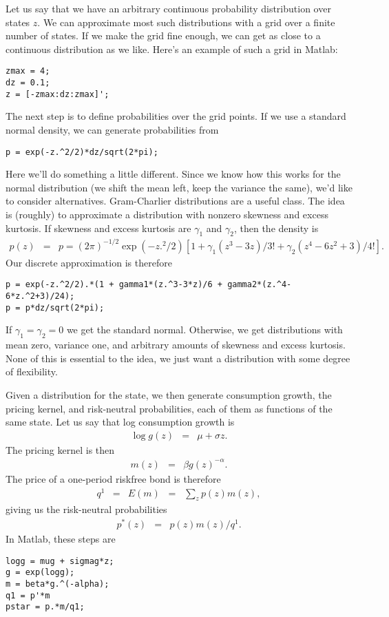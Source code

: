 \documentclass[11pt]{article}
\begin{document}
Let us say that we have an arbitrary continuous probability distribution over states $z$.
We can approximate most such distributions with a grid over a finite number
of states.
If we make the grid fine enough, we can get as close to a continuous distribution
as we like.
Here's an example of such a grid in Matlab:
\begin{verbatim}
zmax = 4;
dz = 0.1;
z = [-zmax:dz:zmax]';
\end{verbatim}
The next step is to define probabilities over the grid points.
If we use a standard normal density, we can generate probabilities from
\begin{verbatim}
p = exp(-z.^2/2)*dz/sqrt(2*pi);
\end{verbatim}
Here we'll do something a little different.
Since we know how this works for the normal distribution
(we shift the mean left, keep the variance the same),
we'd like to consider alternatives.
Gram-Charlier distributions are a useful class.
The idea is (roughly) to approximate a distribution
with nonzero skewness and excess kurtosis.
If skewness and excess kurtosis are $\gamma_1$ and $\gamma_2$,
then the density is
\begin{eqnarray*}
    p(z) &=& p = (2 \pi)^{-1/2} \exp(-z.^2/2)[1 + \gamma_1(z^3-3z)/3! + \gamma_2(z^4-6z^2+3)/4!] .
\end{eqnarray*}
Our discrete approximation is therefore
\begin{verbatim}
p = exp(-z.^2/2).*(1 + gamma1*(z.^3-3*z)/6 + gamma2*(z.^4-6*z.^2+3)/24);
p = p*dz/sqrt(2*pi);
\end{verbatim}
If $\gamma_1 = \gamma_2 = 0$ we get the standard normal.
Otherwise, we get distributions with mean zero, variance one,
and arbitrary amounts of skewness and excess kurtosis.
None of this is essential to the idea, we just want a distribution with some
degree of flexibility.

Given a distribution for the state, we then generate consumption
growth, the pricing kernel, and risk-neutral probabilities,
each of them as functions of the same state.
Let us say that log consumption growth is
\begin{eqnarray*}
    \log g(z) &=& \mu + \sigma z .
\end{eqnarray*}
The pricing kernel is then
\begin{eqnarray*}
    m(z) &=& \beta g(z)^{-\alpha}  .
\end{eqnarray*}
The price of a one-period riskfree bond is therefore
\begin{eqnarray*}
    q^1 &=& E(m) \;\;=\;\; \sum_z p(z) m(z) ,
\end{eqnarray*}
giving us the risk-neutral probabilities
\begin{eqnarray*}
    p^*(z) &=& p(z) m(z) / q^1 .
\end{eqnarray*}
In Matlab, these steps are
\begin{verbatim}
logg = mug + sigmag*z;
g = exp(logg);
m = beta*g.^(-alpha);
q1 = p'*m
pstar = p.*m/q1;
\end{verbatim}
\end{document}
